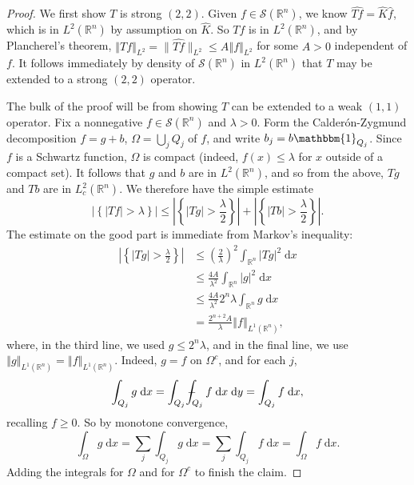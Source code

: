 \documentclass{book}
\newcommand{\scrS}{\mathscr{S}}
\newcommand{\bbR}{\mathbb{R}}
\newcommand{\bbone}{\mathbbm{1}}
\renewcommand{\d}{\mathrm{d}}
\newcommand{\abs}[1]{\left\lvert {#1} \right\rvert}
\newcommand{\norm}[1]{\left\Vert {#1} \right\Vert}
\newcommand{\fhnorm}[1]{\lVert {#1} \rVert}
\newcommand{\set}[1]{\left\{ {#1} \right\}}
\newcommand{\parens}[1]{\left( {#1} \right)}
\def\Xint#1{\mathchoice
{\XXint\displaystyle\textstyle{#1}}%
{\XXint\textstyle\scriptstyle{#1}}%
{\XXint\scriptstyle\scriptscriptstyle{#1}}%
{\XXint\scriptscriptstyle\scriptscriptstyle{#1}}%
\!\int}
\def\XXint#1#2#3{{\setbox0=\hbox{$#1{#2#3}{\int}$ }
\vcenter{\hbox{$#2#3$ }}\kern-.6\wd0}}
\def\dashint{\Xint-}
\theoremstyle{definition}
\theoremstyle{remark}
\numberwithin{equation}{chapter}
\begin{document}
\begin{proof}
    We first show $T$ is strong $(2,2)$. Given $f \in \scrS(\bbR^n)$, we know $\widehat{Tf} = \widehat{K} \widehat{f}$, which is in $L^2(\bbR^n)$ by assumption on $\widehat{K}$. So $Tf$ is in $L^2(\bbR^n)$, and by Plancherel's theorem, $\norm{Tf}_{L^2} = \fhnorm{\widehat{Tf}}_{L^2} \leq A\norm{f}_{L^2}$ for some $A > 0$ independent of $f$. It follows immediately by density of $\scrS(\bbR^n)$ in $L^2(\bbR^n)$ that $T$ may be extended to a strong $(2,2)$ operator.
    
    The bulk of the proof will be from showing $T$ can be extended to a weak $(1,1)$ operator. Fix a nonnegative $f \in \scrS(\bbR^n)$ and $\lambda > 0$. Form the Calder\'on-Zygmund decomposition $f = g + b$, $\Omega = \bigcup_j Q_j$ of $f$, and write $b_j = b \bbone_{Q_j}$. Since $f$ is a Schwartz function, $\Omega$ is compact (indeed, $f(x) \leq \lambda$ for $x$ outside of a compact set). It follows that $g$ and $b$ are in $L^2(\bbR^n)$, and so from the above, $Tg$ and $Tb$ are in $L_c^2(\bbR^n)$. We therefore have the simple estimate 
    \begin{equation}
        \abs{\set{ \abs{Tf} > \lambda }} \leq \abs{\set{ \abs{Tg} > \frac{\lambda}{2} }} + \abs{\set{ \abs{Tb} > \frac{\lambda}{2} }}.
    \end{equation}
    The estimate on the good part is immediate from Markov's inequality:
    \begin{equation} \begin{aligned}
        \abs{\set{ \abs{Tg} > \frac{\lambda}{2} }} 
        &\leq \parens{\frac{2}{\lambda}}^2 \int_{\bbR^n} \abs{Tg}^2 \; \d{x} \\
        &\leq \frac{4A}{\lambda^2} \int_{\bbR^n} \abs{g}^2 \; \d{x} \\
        &\leq \frac{4A}{\lambda^2} 2^n \lambda \int_{\bbR^n} g \; \d{x} \\
        &= \frac{2^{n+2}A}{\lambda} \norm{f}_{L^1(\bbR^n)},
    \end{aligned} \end{equation}
    where, in the third line, we used $g \leq 2^n \lambda$, and in the final line, we use $\norm{g}_{L^1(\bbR^n)} = \norm{f}_{L^1(\bbR^n)}$. Indeed, $g = f$ on $\Omega^c$, and for each $j$, 
    \begin{equation}
        \int_{Q_j} g \; \d{x} 
        = \int_{Q_j} \dashint_{Q_j} f \; \d{x} \; \d{y}
        = \int_{Q_j} f \; \d{x},
    \end{equation}
    recalling $f \geq 0$. So by monotone convergence, 
    \begin{equation}
        \int_\Omega g \; \d{x}
        = \sum_j \int_{Q_j} g \; \d{x}
        = \sum_j \int_{Q_j} f \; \d{x}
        = \int_\Omega f \; \d{x}.
    \end{equation}
    Adding the integrals for $\Omega$ and for $\Omega^c$ to finish the claim.


\end{proof}
\end{document}
